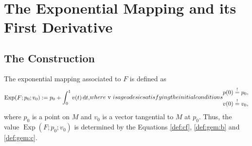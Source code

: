 \section{The Exponential Mapping and its First Derivative}



\subsection{The Construction}


The exponential mapping associated to $ F $ is defined as
\begin{subequations}
    \label{def:gem}
    \begin{align}
        \label{def:gem:a}
        \operatorname{Exp}( F; p_0; v_0 )  :=
        p_0  +  \int^1_0 v( t ) \intd{ t } ,
    \end{align}
    where $ v $ is a geodesic satisfying the initial conditions
    \begin{align}
        p( 0 )  &\overset{ ! }{ = }   p_0 ,
        \label{def:gem:b}\\
        v( 0 )  &\overset{ ! }{ = }   v_0 ,
        \label{def:gem:c}
    \end{align}
\end{subequations}
where $ p_0 $ is a point on $ M $ and
$ v_0 $ is a vector tangential to $ M $ at $ p_0 $.
Thus, the value $ \operatorname{Exp}(F;p_0;v_0) $
is determined by the Equations \eqref{def:cf},
\eqref{def:gem:b} and \eqref{def:gem:c}.


